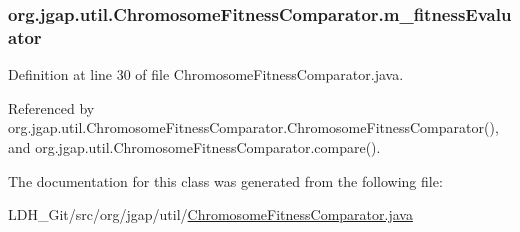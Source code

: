 \hypertarget{classorg_1_1jgap_1_1util_1_1_chromosome_fitness_comparator_afe202126def6a65145bae12f304d0c47}{
\subsubsection[{m\-\_\-fitness\-Evaluator}]{ org.\-jgap.\-util.\-Chromosome\-Fitness\-Comparator.\-m\-\_\-fitness\-Evaluator\hspace{0.3cm}{\ttfamily [private]}}}\label{classorg_1_1jgap_1_1util_1_1_chromosome_fitness_comparator_afe202126def6a65145bae12f304d0c47}


Definition at line 30 of file Chromosome\-Fitness\-Comparator.\-java.



Referenced by org.\-jgap.\-util.\-Chromosome\-Fitness\-Comparator.\-Chromosome\-Fitness\-Comparator(), and org.\-jgap.\-util.\-Chromosome\-Fitness\-Comparator.\-compare().



The documentation for this class was generated from the following file\-:\begin{DoxyCompactItemize}
\item 
L\-D\-H\-\_\-\-Git/src/org/jgap/util/\hyperlink{_chromosome_fitness_comparator_8java}{Chromosome\-Fitness\-Comparator.\-java}\end{DoxyCompactItemize}
